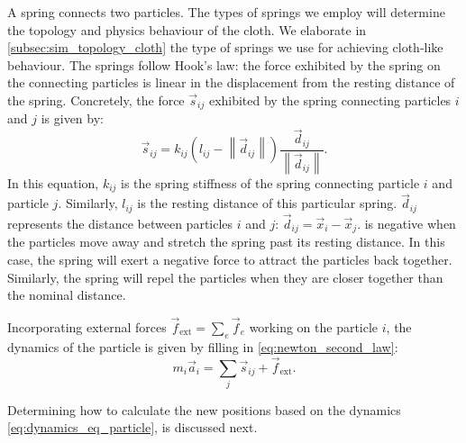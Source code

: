 \documentclass[\home/main.tex]{subfiles}
\begin{document}
A spring connects two particles. The types of springs we employ will determine the topology and physics behaviour of the cloth. We elaborate in \cref{subsec:sim_topology_cloth} the type of springs we use for achieving cloth-like behaviour. The springs follow Hook's law: the force exhibited by the spring on the connecting particles is linear in the displacement from the resting distance of the spring. Concretely, the force $\vec{s}_{ij}$ exhibited by the spring connecting particles $i$ and $j$ is given by:
\begin{equation}\label{eq:hook_spring}
    \vec{s}_{ij}=k_{i j}\left(l_{i j}-\left\|\vec{d}_{ij}\right\|\right) \frac{\vec{d}_{ij}}{\left\|\vec{d}_{ij}\right\|}.
\end{equation}
In this equation, $k_{ij}$ is the spring stiffness of the spring connecting particle $i$ and particle $j$. Similarly, $l_{ij}$ is the resting distance of this particular spring. $\vec{d}_{ij}$ represents the distance between particles $i$ and $j$: $\vec{d}_{ij} = \vec{x}_i - \vec{x}_j$.  is negative when the particles move away and stretch the spring past its resting distance. In this case, the spring will exert a negative force to attract the particles back together. Similarly, the spring will repel the particles when they are closer together than the nominal distance.

Incorporating external forces $\vec{f}_{\text{ext}} = \sum_e \vec{f}_e$ working on the particle $i$, the dynamics of the particle is given by filling in \cref{eq:newton_second_law}:
\begin{equation} \label{eq:dynamics_eq_particle}
    m_i \vec{a}_i = \sum_j \vec{s}_{ij} + \vec{f}_{\text{ext}}.
\end{equation}

Determining how to calculate the new positions based on the dynamics \cref{eq:dynamics_eq_particle}, is discussed next.
\end{document}
